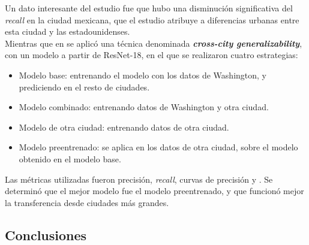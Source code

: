 Un dato interesante del estudio fue que hubo una disminución significativa del \textit{recall} en la ciudad mexicana, que el estudio atribuye a diferencias urbanas entre esta ciudad y las estadounidenses.
\\

Mientras que en \textcite{weld2019} se aplicó una técnica denominada \textbf{\textit{cross-city generalizability}}, con un modelo a partir de ResNet-18, en el que se realizaron cuatro estrategias:
\begin{itemize}
  \item Modelo base: entrenando el modelo con los datos de Washington, y prediciendo en el resto de ciudades.
  \item Modelo combinado: entrenando datos de Washington y otra ciudad.
  \item Modelo de otra ciudad: entrenando datos de otra ciudad.
  \item Modelo preentrenado: se aplica  en los datos de otra ciudad, sobre el modelo obtenido en el modelo base.
\end{itemize}

Las métricas utilizadas fueron precisión, \textit{recall}, curvas de precisión y . Se determinó que el mejor modelo fue el modelo preentrenado, y que funcionó mejor la transferencia desde ciudades más grandes.
\\

\subsection{Conclusiones}
\label{subsec:validacion-conclusiones}

